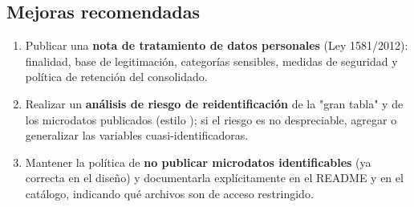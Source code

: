 \subsection{Mejoras recomendadas}

\begin{enumerate}
  \item Publicar una \textbf{nota de tratamiento de datos personales} (Ley
        1581/2012): finalidad, base de legitimación, categorías sensibles,
        medidas de seguridad y política de retención del consolidado.
  \item Realizar un \textbf{análisis de riesgo de reidentificación} de la
        "gran tabla" y de los microdatos publicados (estilo
        \citet{rocher2019estimating}); si el riesgo es no despreciable,
        agregar o generalizar las variables cuasi-identificadoras.
  \item Mantener la política de \textbf{no publicar microdatos identificables}
        (ya correcta en el diseño) y documentarla explícitamente en el README y
        en el catálogo, indicando qué archivos son de acceso restringido.
\end{enumerate}
